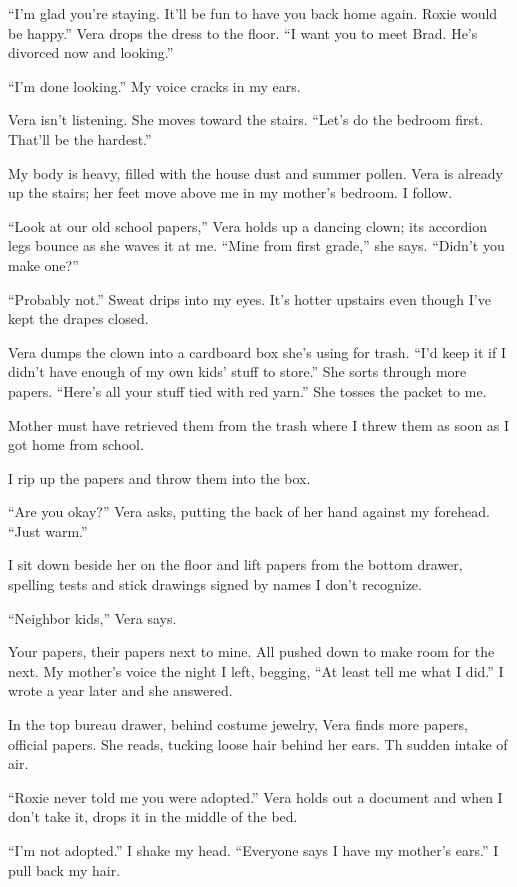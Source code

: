 \documentclass[twoside,10pt]{book}
\begin{document}
``I'm glad you're staying. It'll be fun to have you back home again.
Roxie would be happy.'' Vera drops the dress to the floor. ``I want you
to meet Brad. He's divorced now and looking.''

``I'm done looking.'' My voice cracks in my ears.

Vera isn't listening. She moves toward the stairs. ``Let's do the
bedroom first. That'll be the hardest.''

My body is heavy, filled with the house dust and summer pollen. Vera is
already up the stairs; her feet move above me in my mother's bedroom. I
follow.

``Look at our old school papers,'' Vera holds up a dancing clown; its
accordion legs bounce as she waves it at me. ``Mine from first grade,''
she says. ``Didn't you make one?''

``Probably not.'' Sweat drips into my eyes. It's hotter upstairs even
though I've kept the drapes closed.

Vera dumps the clown into a cardboard box she's using for trash. ``I'd
keep it if I didn't have enough of my own kids' stuff to store.'' She
sorts through more papers. ``Here's all your stuff tied with red yarn.''
She tosses the packet to me.

Mother must have retrieved them from the trash where I threw them as
soon as I got home from school.

I rip up the papers and throw them into the box.

``Are you okay?'' Vera asks, putting the back of her hand against my
forehead. ``Just warm.''

I sit down beside her on the floor and lift papers from the bottom
drawer, spelling tests and stick drawings signed by names I don't
recognize.

``Neighbor kids,'' Vera says.

Your papers, their papers next to mine. All pushed down to make room for
the next. My mother's voice the night I left, begging, ``At least tell
me what I did.'' I wrote a year later and she answered.

In the top bureau drawer, behind costume jewelry, Vera finds more
papers, official papers. She reads, tucking loose hair behind her ears.
Th sudden intake of air.

``Roxie never told me you were adopted.'' Vera holds out a document and
when I don't take it, drops it in the middle of the bed.

``I'm not adopted.'' I shake my head. ``Everyone says I have my mother's
ears.'' I pull back my hair.
\end{document}

